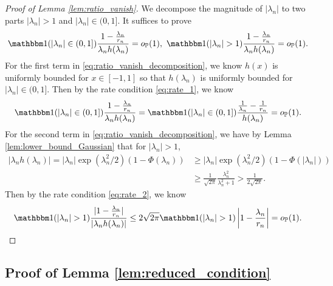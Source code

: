 \documentclass[12pt]{article}
\theoremstyle{definition}
\def\P{\mathbb{P}}
\def\P{\mathbb{P}}
\renewcommand{\P}{\mathbb{P}}							%
\newcommand{\indicator}{\mathbbm 1}						%
\begin{document}
\begin{proof}[Proof of Lemma \ref{lem:ratio_vanish}]
	We decompose the magnitude of $|\lambda_n|$ to two parts $|\lambda_n|>1$ and $|\lambda_n|\in (0,1]$. It suffices to prove 
	\begin{align}\label{eq:ratio_vanish_decomposition}
		\indicator(|\lambda_n| \in(0,1])\frac{1-\frac{\lambda_n}{r_n}}{\lambda_nh(\lambda_n)}=o_{\P}(1),\ \indicator(|\lambda_n| >1)\frac{1-\frac{\lambda_n}{r_n}}{\lambda_nh(\lambda_n)}=o_{\P}(1).
	\end{align} 
	For the first term in \eqref{eq:ratio_vanish_decomposition}, we know $h(x)$ is uniformly bounded for $x\in[-1,1]$ so that $h(\lambda_n)$ is uniformly bounded for $|\lambda_n|\in (0,1]$. Then by the rate condition \eqref{eq:rate_1}, we know 
	\begin{align*}
		\indicator(|\lambda_n| \in(0,1])\frac{1-\frac{\lambda_n}{r_n}}{\lambda_nh(\lambda_n)}=\indicator(|\lambda_n| \in(0,1])\frac{\frac{1}{\lambda_n}-\frac{1}{r_n}}{h(\lambda_n)}=o_{\P}(1).
	\end{align*}
	For the second term in \eqref{eq:ratio_vanish_decomposition},  we have by Lemma \ref{lem:lower_bound_Gaussian} that for $|\lambda_n|> 1$,
	\begin{align*}
		|\lambda_nh(\lambda_n)|=|\lambda_n|\exp(\lambda_n^2/2)(1-\Phi(\lambda_n))
		&
		\geq |\lambda_n|\exp(\lambda_n^2/2)(1-\Phi(|\lambda_n|))\\
		&
		\geq \frac{1}{\sqrt{2\pi}}\frac{\lambda_n^2}{\lambda_n^2+1}> \frac{1}{2\sqrt{2\pi}}.
	\end{align*}
	Then by the rate condition \eqref{eq:rate_2}, we know
	\begin{align*}
		\indicator(|\lambda_n| >1)\frac{|1-\frac{\lambda_n}{r_n}|}{|\lambda_nh(\lambda_n)|}\leq 2\sqrt{2\pi}\indicator(|\lambda_n| >1)\left|1-\frac{\lambda_n}{r_n}\right|=o_{\P}(1).
	\end{align*}
\end{proof}

\subsection{Proof of Lemma \ref{lem:reduced_condition}}
\end{document}
